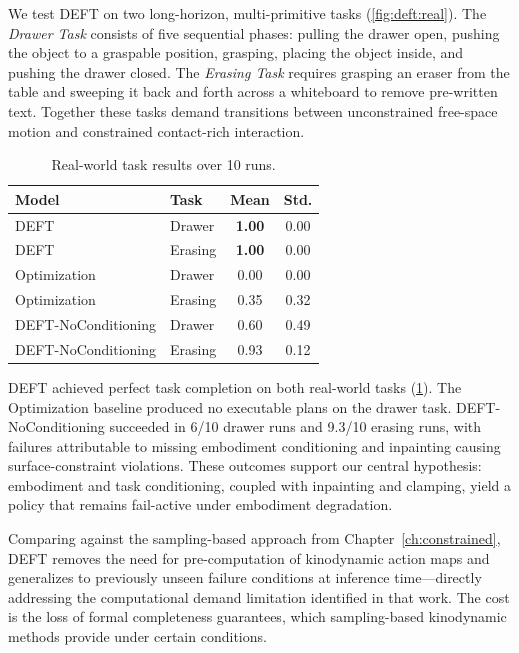 We test DEFT on two long-horizon, multi-primitive tasks (\cref{fig:deft:real}). The \textit{Drawer Task} consists of five sequential phases: pulling the drawer open, pushing the object to a graspable position, grasping, placing the object inside, and pushing the drawer closed. The \textit{Erasing Task} requires grasping an eraser from the table and sweeping it back and forth across a whiteboard to remove pre-written text. Together these tasks demand transitions between unconstrained free-space motion and constrained contact-rich interaction.

\begin{table}[h]
\centering
\caption{Real-world task results over 10 runs.}
\label{tab:deft:rw}
\begingroup
\setlength{\tabcolsep}{5pt}
\renewcommand{\arraystretch}{1.1}
\footnotesize
\begin{tabular}{@{}llcc@{}}
\hline
\textbf{Model} & \textbf{Task} & \textbf{Mean} & \textbf{Std.}  \\
\hline
DEFT                & Drawer  & \textbf{1.00} & 0.00  \\
DEFT                & Erasing & \textbf{1.00} & 0.00 \\
Optimization        & Drawer  & 0.00 & 0.00 \\
Optimization        & Erasing & 0.35 & 0.32 \\
DEFT-NoConditioning & Drawer  & 0.60 & 0.49 \\
DEFT-NoConditioning & Erasing & 0.93 & 0.12 \\
\hline
\end{tabular}
\endgroup
\end{table}

\textsc{DEFT} achieved perfect task completion on both real-world tasks (\cref{tab:deft:rw}). The Optimization baseline produced no executable plans on the drawer task. \textsc{DEFT}-NoConditioning succeeded in 6/10 drawer runs and 9.3/10 erasing runs, with failures attributable to missing embodiment conditioning and inpainting causing surface-constraint violations. These outcomes support our central hypothesis: embodiment and task conditioning, coupled with inpainting and clamping, yield a policy that remains fail-active under embodiment degradation.

Comparing against the sampling-based approach from Chapter~\ref{ch:constrained}, DEFT removes the need for pre-computation of kinodynamic action maps and generalizes to previously unseen failure conditions at inference time---directly addressing the computational demand limitation identified in that work. The cost is the loss of formal completeness guarantees, which sampling-based kinodynamic methods provide under certain conditions.
